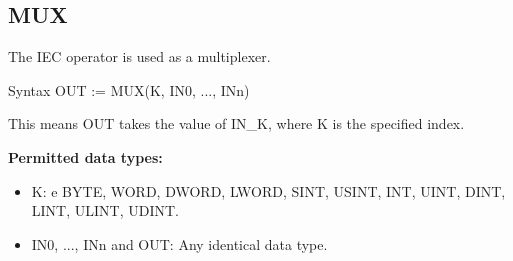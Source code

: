 \subsection{MUX}

The IEC operator is used as a multiplexer.

\begin{Box1}{Syntax}
	OUT := MUX(K, IN0, ..., INn)
\end{Box1}

This means OUT takes the value of IN\_K, where K is the specified index.

\textbf{Permitted data types:}
\begin{itemize}
\item K:  e  BYTE, WORD, DWORD, LWORD, SINT, USINT, INT, UINT, DINT, LINT, ULINT, UDINT.

\item  IN0, ..., INn and OUT: Any identical data type.%
	



\end{itemize}
\newpage

